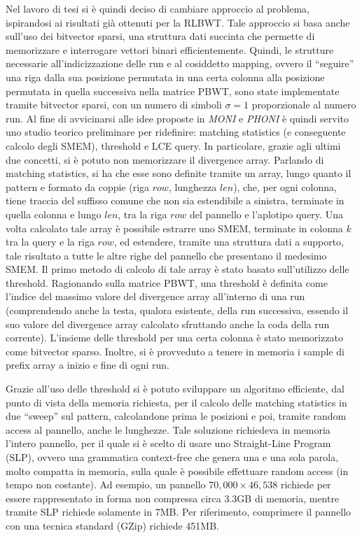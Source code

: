 \documentclass[a4paper,11pt, oneside,italian]{article}
\begin{document}
Nel lavoro di tesi si è quindi deciso di cambiare approccio al problema,
ispirandosi ai risultati già ottenuti per la RLBWT. Tale approccio si basa anche
sull'uso dei bitvector 
sparsi, una struttura dati succinta che permette di memorizzare e interrogare
vettori binari efficientemente.
Quindi, le strutture necessarie all'indicizzazione delle run e al cosiddetto
mapping, ovvero il ``seguire'' una riga dalla sua posizione permutata in una
certa colonna alla posizione permutata in quella successiva nella matrice PBWT,
sono state implementate tramite bitvector sparsi, con un numero di simboli
$\sigma=1$ proporzionale al numero run.
Al fine di avvicinarsi alle idee proposte in \textit{MONI} e \textit{PHONI} è
quindi servito uno studio teorico preliminare per ridefinire: matching
statistics (e conseguente calcolo degli SMEM), threshold e LCE query. In
particolare, grazie agli  
ultimi due concetti, si è potuto non memorizzare il divergence array.
Parlando di matching statistics, si ha che esse sono definite tramite un array,
lungo quanto il pattern e formato da coppie (riga $row$, lunghezza $len$), che,
per ogni colonna, tiene traccia del suffisso comune che non sia estendibile a
sinistra, terminate in quella colonna e lungo $len$, tra la riga $row$ del
pannello e l'aplotipo query. Una volta calcolato tale
array è possibile estrarre uno SMEM, terminate in colonna $k$ tra la query e la
riga $row$, ed estendere, tramite una struttura dati a supporto, tale risultato
a tutte le altre righe del pannello che presentano il medesimo SMEM.
Il primo metodo di calcolo di tale array è stato basato sull'utilizzo delle
threshold. Ragionando sulla matrice PBWT, una threshold è definita
come l'indice del massimo valore del divergence array all'interno di una run
(comprendendo anche la testa, qualora esistente, della run successiva, essendo
il suo valore del divergence array calcolato sfruttando anche la coda della run
corrente). L'insieme delle threshold per una certa colonna è stato memorizzato
come bitvector sparso. Inoltre, si è provveduto a tenere in memoria i
sample di prefix array a inizio e fine di ogni run.

Grazie all'uso delle threshold si è potuto sviluppare un algoritmo
efficiente, dal punto di vista della memoria richiesta, per il calcolo delle
matching statistics in due ``sweep'' sul pattern, calcolandone prima le
posizioni e poi, tramite random access al pannello, anche le
lunghezze. Tale soluzione richiedeva in memoria l'intero pannello, per il quale
si è scelto di usare uno Straight-Line Program (SLP), ovvero una grammatica
context-free che genera una e una sola parola, molto compatta in memoria, sulla
quale è possibile effettuare random access (in tempo non costante).
Ad esempio, un pannello $70,000 \times 46,538$ richiede per essere rappresentato
in forma non compressa circa 3.3GB di memoria, mentre tramite SLP richiede
solamente in 7MB. Per riferimento, comprimere il pannello con una tecnica
standard (GZip) richiede 451MB. 
\end{document}
